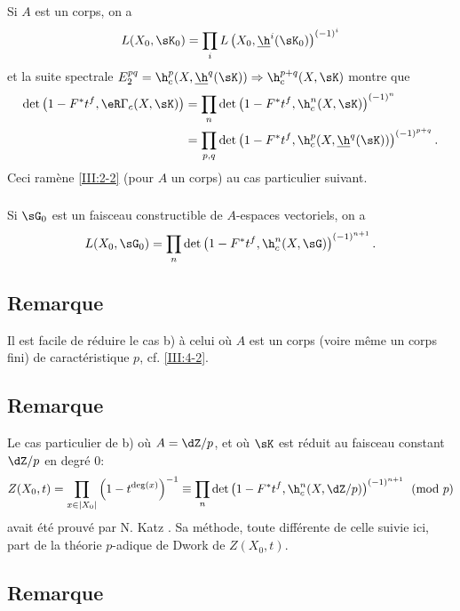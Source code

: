 Si $A$ est un corps, on a 
\[
  L(X_0,\sK_0) = \prod_i L\left(X_0,\underline\h^i(\sK_0)\right)^{(-1)^i}
\]
et la suite spectrale 
$E_2^{p q} = \h_c^p(X,\underline\h^q(\sK))\Rightarrow \h_c^{p+q}(X,\sK)$ montre 
que 
\begin{align*}
  \det\left(1-F^* t^f, \eR\Gamma_c(X,\sK)\right) 
    &= \prod_n \det\left(1-F^* t^f,\h_c^n(X,\sK)\right)^{(-1)^n} \\
    &= \prod_{p,q} \det\left(1-F^* t^f,\h_c^p(X,\underline\h^q(\sK))\right)^{(-1)^{p+q}} \text{.}
\end{align*}
Ceci ramène \ref{III:2-2} (pour $A$ un corps) au cas particulier suivant. 


\subsubsection{}\label{III:2-4-1}

Si $\sG_0$ est un faisceau constructible de $A$-espaces vectoriels, on a 
\[
  L(X_0,\sG_0) = \prod_n \det\left(1-F^* t^f,\h_c^n(X,\sG)\right)^{(-1)^{n+1}} \text{.}
\]





\subsection{Remarque}\label{III:2-5}

Il est facile de réduire le cas b) à celui où $A$ est un corps (voire 
même un corps fini) de caractéristique $p$, cf. \ref{III:4-2}. 





\subsection{Remarque}\label{III:2-6}

Le cas particulier de b) où $A=\dZ/p$, et où $\sK$ est réduit au faisceau 
constant $\dZ/p$ en degré $0$:
\[
  Z(X_0,t) = \prod_{x\in |X_0|} \left(1-t^{\deg(x)}\right)^{-1}
      \equiv \prod_n \det\left(1-F^* t^f,\h_c^n(X,\dZ/p)\right)^{(-1)^{n+1}} \pmod p
\]
avait été prouvé par N. Katz . Sa méthode, toute 
différente de celle suivie ici, part de la théorie $p$-adique de Dwork de 
$Z(X_0,t)$. 





\subsection{Remarque}\label{III:2-7}


